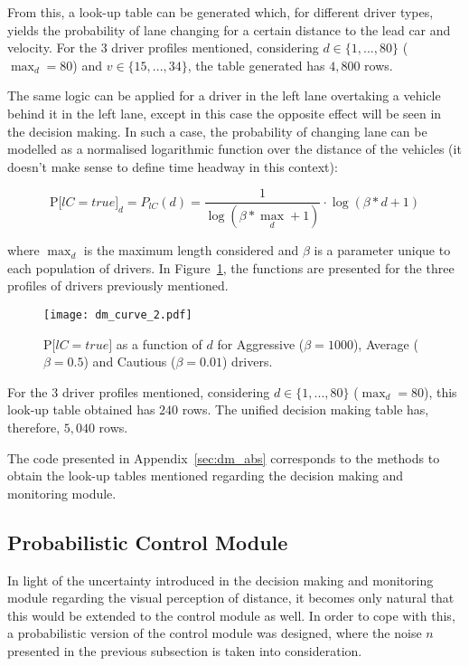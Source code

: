 From this, a look-up table can be generated which, for different driver types, yields the probability of lane changing for a certain distance to the lead car and velocity. For the 3 driver profiles mentioned, considering $d \in \{1,...,80\}$ ($\max_d = 80$) and $v \in \{15,...,34\}$, the table generated has $4,800$ rows.

The same logic can be applied for a driver in the left lane overtaking a vehicle behind it in the left lane, except in this case the opposite effect will be seen in the decision making. In such a case, the probability of changing lane can be modelled as a normalised logarithmic function over the distance of the vehicles (it doesn't make sense to define time headway in this context):

\begin{equation}
	\text{P[}lC = true\text{]}_{d} = P_{lC}(d) = \frac{1}{\log(\beta*\max_d + 1)}\cdot \log(\beta*d + 1)
\end{equation}

where $\max_d$ is the maximum length considered and $\beta$ is a parameter unique to each population of drivers. In Figure~\ref{fig:dm_curve_2}, the functions are presented for the three profiles of drivers previously mentioned.

\begin{figure}[h]
    \centering
    \texttt{[image: dm\_curve\_2.pdf]}
    \caption{$\text{P[}lC = true\text{]}$ as a function of $d$ for Aggressive ($\beta = 1000$), Average ($\beta = 0.5$) and Cautious ($\beta = 0.01$) drivers.}
    \label{fig:dm_curve_2}
\end{figure}

For the 3 driver profiles mentioned, considering $d \in \{1,...,80\}$ ($\max_d = 80$), this look-up table obtained has $240$ rows. The unified decision making table has, therefore, $5,040$ rows.

The code presented in Appendix~\ref{sec:dm_abs} corresponds to the methods to obtain the look-up tables mentioned regarding the decision making and monitoring module.

\subsection{Probabilistic Control Module}

In light of the uncertainty introduced in the decision making and monitoring module regarding the visual perception of distance, it becomes only natural that this would be extended to the control module as well. In order to cope with this, a probabilistic version of the control module was designed, where the noise $n$ presented in the previous subsection is taken into consideration. 

